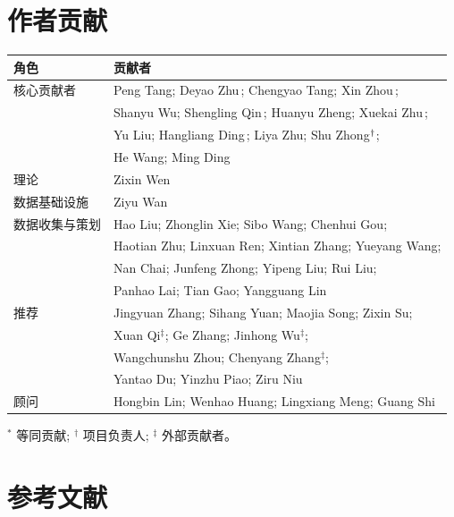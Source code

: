 
\section*{作者贡献}

\begin{center}
\begin{tabular}{ll}
\toprule
\textbf{角色} & \textbf{贡献者} \\
\midrule
核心贡献者 & Peng Tang; Deyao Zhu$^{\*}$; Chengyao Tang; Xin Zhou$^{\*}$; \\
 & Shanyu Wu; Shengling Qin$^{\*}$; Huanyu Zheng; Xuekai Zhu$^{\*}$; \\
 & Yu Liu; Hangliang Ding$^{\*}$; Liya Zhu; Shu Zhong$^{\*\dagger}$; \\
 & He Wang; Ming Ding \\
\midrule
理论 & Zixin Wen \\
\midrule
数据基础设施 & Ziyu Wan \\
\midrule
数据收集与策划 & Hao Liu; Zhonglin Xie; Sibo Wang; Chenhui Gou; \\
 & Haotian Zhu; Linxuan Ren; Xintian Zhang; Yueyang Wang; \\
 & Nan Chai; Junfeng Zhong; Yipeng Liu; Rui Liu; \\
 & Panhao Lai; Tian Gao; Yangguang Lin \\
\midrule
推荐 & Jingyuan Zhang; Sihang Yuan; Maojia Song; Zixin Su; \\
 & Xuan Qi$^{\ddagger}$; Ge Zhang; Jinhong Wu$^{\ddagger}$; \\
 & Wangchunshu Zhou; Chenyang Zhang$^{\ddagger}$; \\
 & Yantao Du; Yinzhu Piao; Ziru Niu \\
\midrule
顾问 & Hongbin Lin; Wenhao Huang; Lingxiang Meng; Guang Shi \\
\bottomrule
\end{tabular}
\end{center}

\vspace{0.5em}
\noindent\footnotesize $^{*}$ 等同贡献; $^{\dagger}$ 项目负责人; $^{\ddagger}$ 外部贡献者。

\section*{参考文献}

